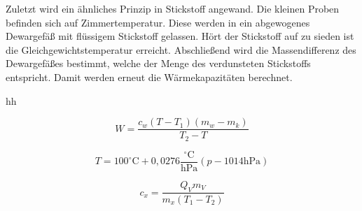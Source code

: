 Zuletzt wird ein ähnliches Prinzip in Stickstoff angewand. Die kleinen Proben befinden sich auf Zimmertemperatur.
Diese werden in ein abgewogenes Dewargefäß mit flüssigem Stickstoff gelassen. Hört der Stickstoff auf zu sieden ist die Gleichgewichtstemperatur erreicht.
Abschließend wird die Massendifferenz des Dewargefäßes bestimmt, welche der Menge des verdunsteten Stickstoffs entspricht.
Damit werden erneut die Wärmekapazitäten berechnet.

hh


\begin{equation}
    W=\frac{c_{w} \left(T - T_{1}\right) \left(  m_{w}- m_{k}\right)}{ T_{2}- T}
    \label{eq:Wasserwert}
\end{equation}

\begin{equation}
    T = 100^\circ \text{C} + 0,0276 \frac{^\circ \text{C}}{\text{hPa}}(p -1014 \text{hPa})
    \label{eq:Siedetemperatur}
\end{equation}

\begin{equation}
    c_x = \frac{Q_V m_V}{m_x(T_1-T_2)}
    \label{eq:cN}
\end{equation}
